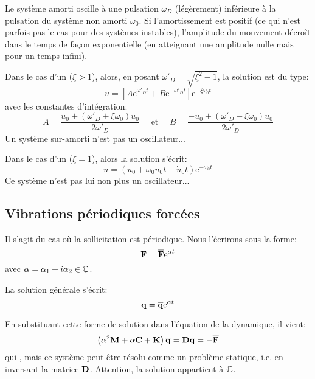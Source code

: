 Le système amorti oscille à une pulsation $\omega_D$ (légèrement) inférieure à la pulsation du
système non amorti $\omega_0$. Si l'amortissement est positif (ce qui n’est parfois pas le cas
pour des systèmes instables), l'amplitude du mouvement décroît dans le temps de façon
exponentielle (en atteignant une amplitude nulle mais pour un temps infini).

\medskip
Dans le cas d'un  ($\xi>1$), alors, en posant $\omega'_D=\sqrt{\xi^2-1}$, la solution est du type:
\begin{equation} u=\left[A\mathrm{e}^{\omega'_D t}+B\mathrm{e}^{-\omega'_D t}\right] \mathrm{e}^{-\xi\omega_0t} \end{equation}
avec les constantes d'intégration: 
\begin{equation}A=\dfrac{\dot{u}_0+(\omega'_D+\xi\omega_0)u_0}{2\omega'_D} \quad \text{ et }\quad
B=\dfrac{-\dot{u}_0+(\omega'_D-\xi\omega_0)u_0}{2\omega'_D} \end{equation}
Un système sur-amorti n'est pas un oscillateur...

\medskip
Dans le cas d'un  ($\xi=1$), alors la solution s'écrit:
\begin{equation}
u = (u_0+\omega_0u_0t+\dot{u}_0t)\mathrm{e}^{-\omega_0 t}
\end{equation}
Ce système n'est pas lui non plus un oscillateur...




\medskip{}
\subsection{Vibrations périodiques forcées}

Il s'agit du cas où la sollicitation est périodique. Nous l'écrirons sous la forme:
\begin{equation} \VV{F}=\VV{\overline{F}}\mathrm{e}^{\alpha t} \end{equation}
avec $\alpha=\alpha_1+i\alpha_2\in\mathbb C$.

La solution générale s'écrit:
\begin{equation} \VV{q}=\VV{\overline{q}}\mathrm{e}^{\alpha t} \end{equation}

En substituant cette forme de solution dans l'équation de la dynamique, il vient:
\begin{equation} \left(\alpha^2\MM{M}+\alpha\MM{C}+\MM{K}\right)\VV{\overline{q}}=\MM{D}\VV{\overline{q}}=-\VV{\overline{F}} \end{equation}
qui , mais ce système peut être résolu
comme un problème statique, i.e. en inversant la matrice $\MM{D}$. Attention, la solution appartient à $\mathbb C$.

